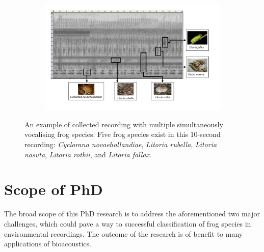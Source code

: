 \begin{figure}[htb!]
\centering
    \begin{subfigure}[b]{\textwidth}
           \includegraphics[width=1\textwidth]{image/LR/label.pdf}
    \end{subfigure}%
\caption[An example of collected recording]{An example of collected recording with multiple simultaneously vocalising frog species. Five frog species exist in this 10-second recording: \textit{Cyclorana novaehollandiae}, \textit{Litoria rubella}, \textit{Litoria nasuta}, \textit{Litoria rothii}, and \textit{Litoria fallax}.}
\label{fig:label}       
\end{figure}






\section{Scope of PhD}
The broad scope of this PhD research is to address the aforementioned two  major challenges, which could pave a way to successful classification of frog species in environmental recordings. The outcome of the research is of benefit to many applications of bioacoustics.

